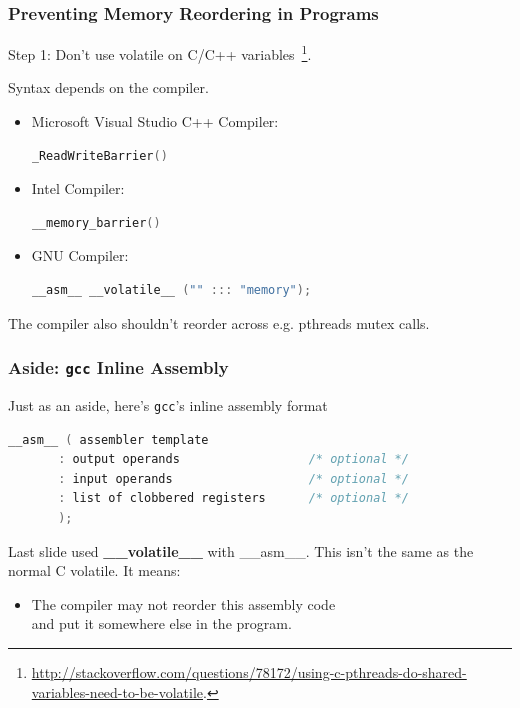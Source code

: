 \begin{frame}[fragile]
  \frametitle{Preventing Memory Reordering in Programs}

  
     Step 1: Don't use volatile on C/C++ variables~\footnote{\tiny \url{http://stackoverflow.com/questions/78172/using-c-pthreads-do-shared-variables-need-to-be-volatile}.}.
     
     Syntax depends on the compiler.

\begin{itemize}
  \item Microsoft Visual Studio C++ Compiler:
  \begin{lstlisting}[language=C]
_ReadWriteBarrier()
  \end{lstlisting}
  \item Intel Compiler:
  \begin{lstlisting}[language=C]
    __memory_barrier()
  \end{lstlisting}
  \item GNU Compiler:
  \begin{lstlisting}[language=C]
__asm__ __volatile__ ("" ::: "memory");
  \end{lstlisting}
\end{itemize}

  The compiler also shouldn't reorder across e.g. pthreads mutex calls.
  
\end{frame}

\begin{frame}[fragile]
  \frametitle{Aside: {\tt gcc} Inline Assembly}

  

  Just as an aside, here's {\tt gcc}'s inline assembly format

  \begin{lstlisting}[language=C]
__asm__ ( assembler template 
       : output operands                  /* optional */
       : input operands                   /* optional */
       : list of clobbered registers      /* optional */
       );
  \end{lstlisting}
  \vfill
  Last slide used {\bf \_\_volatile\_\_} with  \_\_asm\_\_. This isn't the same as the normal C volatile. It means:

  \begin{itemize}
    \item The compiler may not reorder this assembly code\\ and put it somewhere
      else in the program.
  \end{itemize}
  

\end{frame}

